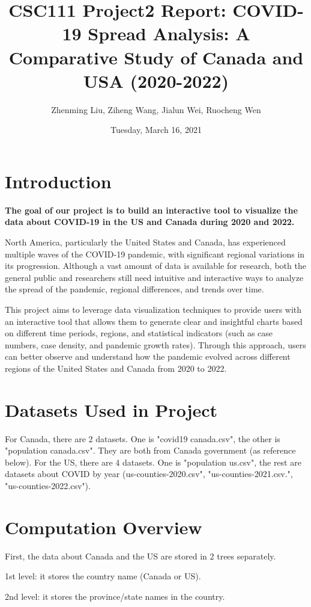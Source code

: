 \documentclass[fontsize=11pt]{article}
\title{CSC111 Project2 Report: COVID-19 Spread Analysis: A Comparative Study of Canada and USA (2020-2022)}
\author{Zhenming Liu, Ziheng Wang, Jialun Wei, Ruocheng Wen}
\date{Tuesday, March 16, 2021}
\begin{document}
\maketitle

\section*{Introduction}

\textbf{The goal of our project is to build an interactive tool to visualize the data about COVID-19 in the US and Canada during 2020 and 2022.} 

North America, particularly the United States and Canada, has experienced multiple waves of the COVID-19 pandemic, with significant regional variations in its progression. Although a vast amount of data is available for research, both the general public and researchers still need intuitive and interactive ways to analyze the spread of the pandemic, regional differences, and trends over time.

This project aims to leverage data visualization techniques to provide users with an interactive tool that allows them to generate clear and insightful charts based on different time periods, regions, and statistical indicators (such as case numbers, case density, and pandemic growth rates). Through this approach, users can better observe and understand how the pandemic evolved across different regions of the United States and Canada from 2020 to 2022.

\section*{Datasets Used in Project}
For Canada, there are 2 datasets. One is "covid19 canada.csv", the other is "population canada.csv". They are both from Canada government (as reference below). For the US, there are 4 datasets. One is "population us.csv", the rest are datasets about COVID by year (us-counties-2020.csv", "us-counties-2021.csv.", "us-counties-2022.csv").

\section*{Computation Overview}
First, the data about Canada and the US are stored in 2 trees separately.  

        1st level: it stores the country name (Canada or US).
        
        2nd level: it stores the province/state names in the country.
        
\end{document}

